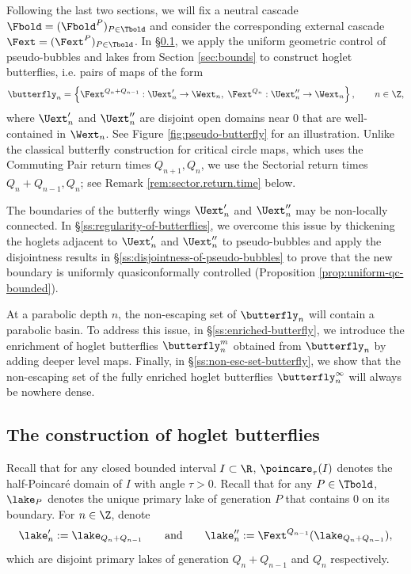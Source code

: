 \documentclass{amsart}
\begin{document}
Following the last two sections, we will fix a neutral cascade $\Fbold = (\Fbold^P)_{P \in \Tbold}$ and consider the corresponding external cascade $\Fext = (\Fext^P)_{P \in \Tbold}$. In \S\ref{ss:butterfly}, we apply the uniform geometric control of pseudo-bubbles and lakes from Section \ref{sec:bounds} to construct hoglet butterflies, i.e. pairs of maps of the form
\begin{equation}
    \label{eq:dfn.HB_n}
    \butterfly_n = \left\{ \Fext^{Q_n+Q_{n-1}}: \Uext'_n \to \Wext_n, \; \Fext^{Q_n}: \Uext''_n \to \Wext_n \right\},
    \qquad
    n \in \Z,
\end{equation}
where $\Uext'_n$ and $\Uext''_n$ are disjoint open domains near $0$ that are well-contained in $\Wext_n$.
See Figure \ref{fig:pseudo-butterfly} for an illustration. Unlike the classical butterfly construction for critical circle maps, which uses the Commuting Pair return times $Q_{n+1},Q_n$, we use the Sectorial return times $Q_n+Q_{n-1}, Q_n$; see Remark \ref{rem:sector.return.time} below.

The boundaries of the butterfly wings $\Uext'_n$ and $\Uext''_n$ may be non-locally connected.
In \S\ref{ss:regularity-of-butterflies}, we overcome this issue by thickening the hoglets adjacent to $\Uext'_n$ and $\Uext''_n$ to pseudo-bubbles and apply the disjointness results in \S\ref{ss:disjointness-of-pseudo-bubbles} to prove that the new boundary is uniformly quasiconformally controlled (Proposition \ref{prop:uniform-qc-bounded}).

At a parabolic depth $n$, the non-escaping set of $\butterfly_n$ will contain a parabolic basin.
To address this issue, in \S\ref{ss:enriched-butterfly}, we introduce the enrichment of hoglet butterflies $\butterfly_n^m$ obtained from $\butterfly_n$ by adding deeper level maps.
Finally, in \S\ref{ss:non-esc-set-butterfly}, we show that the non-escaping set of the fully enriched hoglet butterflies $\butterfly_n^\infty$ will always be nowhere dense.

\subsection{The construction of hoglet butterflies}

\label{ss:butterfly}

Recall that for any closed bounded interval $I \subset \R$, $\poincare_{\tau} (I)$ denotes the half-Poincar\'e domain of $I$ with angle $\tau>0$.
Recall that for any $P \in \Tbold$, $\lake_{P}$ denotes the unique primary lake of generation $P$ that contains $0$ on its boundary.
For $n \in \Z$, denote
\[
    \lake'_n := \lake_{Q_n+Q_{n-1}} \qquad \text{and} \qquad
    \lake''_n := \Fext^{Q_{n-1}}(\lake_{Q_n+Q_{n-1}}),
\]
which are disjoint primary lakes of generation $Q_n+Q_{n-1}$ and $Q_n$ respectively.
\end{document}
